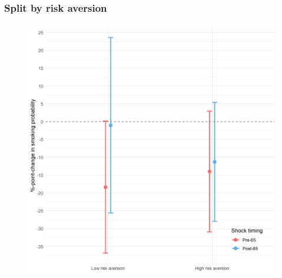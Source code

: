 \documentclass[10pt,compress,xcolor=dvipsnames,aspectratio=169]{beamer}    %
\newcounter{ex}
\newcommand{\1}[1]{\mathrm{1\hspace*{-2.5pt}l}[#1]}	%
\begin{document}
\begin{frame}
\frametitle{Split by risk aversion}

\begin{figure}[hbtp]
\centering
\includegraphics[height=0.8\textheight]{../../3_output/shock_effects/risk_6070_100_cvplot.png}
\label{fig:risk}
\end{figure}
\hyperlink{frame:otherX}{}
\end{frame}
\end{document}
